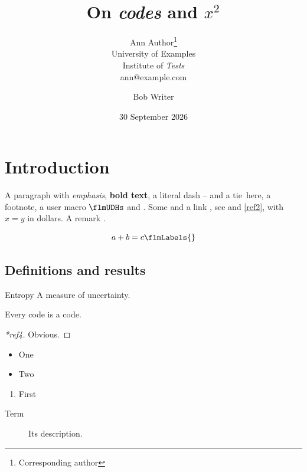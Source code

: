 \documentclass{article}
\begin{document}
\title{On \emph{codes} and \(x^2\)}
\author{Ann Author\thanks{Corresponding author} \\ University of Examples \\ Institute of \emph{Tests} \\ ann@example.com \and Bob Writer}
\date{30 September 2026}
\maketitle
\flmHeading[toc=true]
\section{Introduction}{\flmLabels{\label{ref1}}}

A paragraph with \emph{emphasis}, \textbf{bold text}, a literal dash -- and a tie~here,
a footnote, a user macro \(\flmUDHs\) and .
Some  and a link ,
see  and \eqref{ref2}, with \(x = y\) in dollars. %
A remark .

\begin{equation}
  a + b = c\flmLabels{\label{ref2}}
\end{equation}

\flmHeading[toc=true]
\subsection{Definitions and results}{\flmLabels{}}

\begin{defterm}{Entropy}\ignorespaces
A measure of uncertainty.
\end{defterm}

\begin{theorem}[Main]\flmLabels{\label{ref4}}
Every code is a code.
\end{theorem}
\begin{proof}[*ref4]
Obvious.
\end{proof}

\begin{itemize}
\item\flmLabels{\label{ref5}} One
\item Two
\end{itemize}
\begin{enumerate}
\item First
\end{enumerate}
\begin{description}
\item[Term] Its description.
\end{description}
\end{document}

